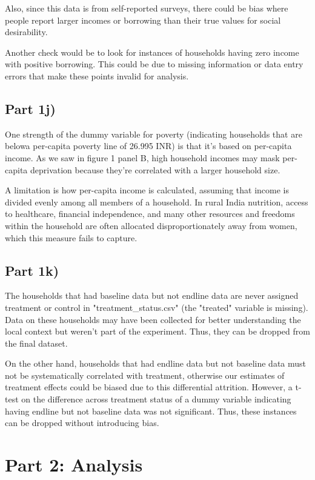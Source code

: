 \documentclass[12pt]{article}
\begin{document}
Also, since this data is from self-reported surveys, there could be bias where people report larger incomes or borrowing than their true values for social desirability. 

Another check would be to look for instances of households having zero income with positive borrowing. This could be due to missing information or data entry errors that make these points invalid for analysis. 

\subsection*{Part 1j)}

One strength of the dummy variable for poverty (indicating households that are belowa per-capita poverty line of 26.995 INR) is that it's based on per-capita income. As we saw in figure 1 panel B, high household incomes may mask per-capita deprivation because they're correlated with a larger household size.

A limitation is how per-capita income is calculated, assuming that income is divided evenly among all members of a household. In rural India nutrition, access to healthcare, financial independence, and many other resources and freedoms within the household are often allocated disproportionately away from women, which this measure fails to capture.


\subsection*{Part 1k)}

The households that had baseline data but not endline data are never assigned treatment or control in "treatment\_status.csv" (the "treated" variable is missing). Data on these households may have been collected for better understanding the local context but weren't part of the experiment. Thus, they can be dropped from the final dataset.

On the other hand, households that had endline data but not baseline data must not be systematically correlated with treatment, otherwise our estimates of treatment effects could be biased due to this differential attrition. However, a t-test on the difference across treatment status of a dummy variable indicating having endline but not baseline data was not significant. Thus, these instances can be dropped without introducing bias. 


\section*{Part 2: Analysis}
\end{document}
